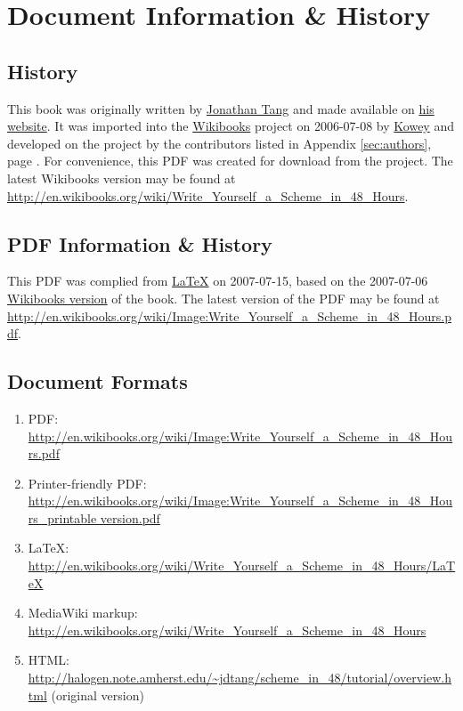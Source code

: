 \chapter[Document Information]{Document Information \& History}
 
\section{History}
 
This book was originally written by \href{http://halogen.note.amherst.edu/~jdtang/}{Jonathan Tang} and made available on \href{http://halogen.note.amherst.edu/~jdtang/scheme_in_48/tutorial/overview.html}{his website}. It was imported into the \href{http://wikibooks.org}{Wikibooks} project on 2006-07-08 by \href{http://en.wikibooks.org/wiki/User:Kowey}{Kowey} and developed on the project by the contributors listed in Appendix \ref{sec:authors}, page \pageref{sec:authors}. For convenience, this PDF was created for download from the project. The latest Wikibooks version may be found at \url{http://en.wikibooks.org/wiki/Write_Yourself_a_Scheme_in_48_Hours}.
 
\section{PDF Information \& History}
 
This PDF was complied from \href{http://en.wikibooks.org/wiki/Write_Yourself_a_Scheme_in_48_Hours/LaTeX}{\LaTeX} on 2007-07-15, based on the 2007-07-06 \href{http://en.wikibooks.org/wiki/Write_Yourself_a_Scheme_in_48_Hours}{Wikibooks version} of the book. The latest version of the PDF may be found at \url{http://en.wikibooks.org/wiki/Image:Write_Yourself_a_Scheme_in_48_Hours.pdf}.
 
\section{Document Formats}
\begin{enumerate}
	\item PDF: \url{http://en.wikibooks.org/wiki/Image:Write_Yourself_a_Scheme_in_48_Hours.pdf}
	\item Printer-friendly PDF: \url{http://en.wikibooks.org/wiki/Image:Write_Yourself_a_Scheme_in_48_Hours_printable version.pdf}
	\item \LaTeX: \url{http://en.wikibooks.org/wiki/Write_Yourself_a_Scheme_in_48_Hours/LaTeX}
	\item MediaWiki markup: \url{http://en.wikibooks.org/wiki/Write_Yourself_a_Scheme_in_48_Hours}
	\item HTML: \url{http://halogen.note.amherst.edu/~jdtang/scheme_in_48/tutorial/overview.html} (original version)
\end{enumerate}
 
